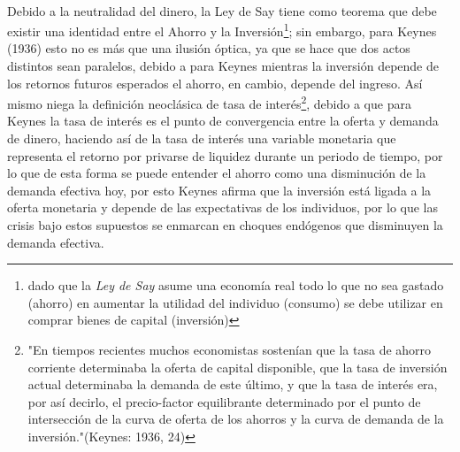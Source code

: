 \documentclass[letter,12pt]{article}
\begin{document}
\begin{flushleft}
    ~\\
    Debido a la neutralidad del dinero, la Ley de Say tiene como teorema que debe existir una identidad entre el Ahorro y la Inversión\footnote{dado que la \textit{Ley de Say} asume una economía real todo lo que no sea gastado (ahorro) en aumentar la utilidad del individuo (consumo) se debe utilizar en comprar bienes de capital (inversión)}; sin embargo, para Keynes (1936) esto no es más que una ilusión óptica, ya que se hace que dos actos distintos sean paralelos, debido a para Keynes mientras la inversión depende de los retornos futuros esperados el ahorro, en cambio, depende del ingreso. Así mismo niega la definición neoclásica de tasa de interés\footnote{"En tiempos recientes muchos economistas sostenían que la tasa de ahorro corriente determinaba la oferta de capital disponible, que la tasa de inversión actual determinaba la demanda de este último, y que la tasa de interés era, por así decirlo, el precio-factor equilibrante determinado por el punto de intersección de la curva de oferta de los ahorros y la curva de demanda de la inversión."(Keynes: 1936, 24)}, debido a que para Keynes la tasa de interés es el punto de convergencia entre la oferta y demanda de dinero, haciendo así de la tasa de interés una variable monetaria que representa el retorno por privarse de liquidez durante un periodo de tiempo, por lo que de esta forma se puede entender el ahorro como una disminución de la demanda efectiva hoy, por esto Keynes afirma que la inversión está ligada a la oferta monetaria y depende de las expectativas de los individuos, por lo que las crisis bajo estos supuestos se enmarcan en choques endógenos que disminuyen la demanda efectiva.
    \newpage
    
    
\end{flushleft}
\end{document}
